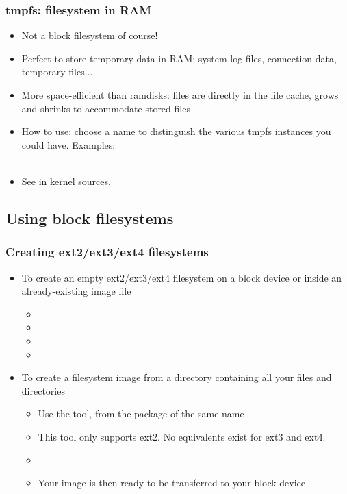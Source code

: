 \begin{frame}
  \frametitle{tmpfs: filesystem in RAM}
  \begin{itemize}
  \item Not a block filesystem of course!
  \item Perfect to store temporary data in RAM: system log files,
    connection data, temporary files...
  \item More space-efficient than ramdisks: files are directly in the
    file cache, grows and shrinks to accommodate stored files
  \item How to use: choose a name to distinguish the various tmpfs
    instances you could have. Examples:\\
    \\
  \item  See  in kernel sources.
  \end{itemize}
\end{frame}

\subsection{Using block filesystems}

\begin{frame}
  \frametitle{Creating ext2/ext3/ext4 filesystems}
  \begin{itemize}
  \item To create an empty ext2/ext3/ext4 filesystem on a block device or
    inside an already-existing image file
    \begin{itemize}
    \item {}
    \item {}
    \item {}
    \item {}
    \end{itemize}
  \item To create a filesystem image from a directory containing all
    your files and directories
    \begin{itemize}
    \item Use the  tool, from the package of the same name
    \item This tool only supports ext2. No equivalents exist for ext3
          and ext4.
    \item {}
    \item Your image is then ready to be transferred to your block
      device
    \end{itemize}
  \end{itemize}
\end{frame}

